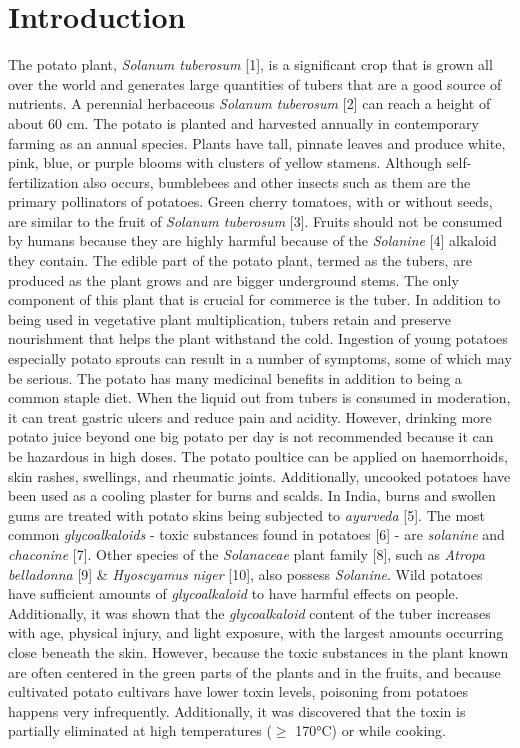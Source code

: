 \documentclass[conference]{IEEEtran}
\begin{document}
\section{Introduction}
The potato plant, \textit{Solanum tuberosum} [1], is a significant crop that is grown all over the world and generates large quantities of tubers that are a good source of nutrients. A perennial herbaceous \textit{Solanum tuberosum} [2] can reach a height of about 60 cm. The potato is planted and harvested annually in contemporary farming as an annual species. Plants have tall, pinnate leaves and produce white, pink, blue, or purple blooms with clusters of yellow stamens. Although self-fertilization also occurs, bumblebees and other insects such as them are the primary pollinators of potatoes. Green cherry tomatoes, with or without seeds, are similar to the fruit of \textit{Solanum tuberosum} [3]. Fruits should not be consumed by humans because they are highly harmful because of the \textit{Solanine} [4] alkaloid they contain. The edible part of the potato plant, termed as the tubers, are produced as the plant grows and are bigger underground stems. The only component of this plant that is crucial for commerce is the tuber. In addition to being used in vegetative plant multiplication, tubers retain and preserve nourishment that helps the plant withstand the cold. Ingestion of young potatoes especially potato sprouts can result in a number of symptoms, some of which may be serious. The potato has many medicinal benefits in addition to being a common staple diet. When the liquid out from tubers is consumed in moderation, it can treat gastric ulcers and reduce pain and acidity. However, drinking more potato juice beyond one big potato per day is not recommended because it can be hazardous in high doses. The potato poultice can be applied on haemorrhoids, skin rashes, swellings, and rheumatic joints. Additionally, uncooked potatoes have been used as a cooling plaster for burns and scalds. In India, burns and swollen gums are treated with potato skins being subjected to \textit{ayurveda} [5]. The most common \textit{glycoalkaloids} - toxic substances found in potatoes [6] - are \textit{solanine} and \textit{chaconine} [7]. Other species of the \textit{Solanaceae} plant family [8], such as \textit{Atropa belladonna} [9] \& \textit{Hyoscyamus niger} [10], also possess \textit{Solanine}. Wild potatoes have sufficient amounts of \textit{glycoalkaloid} to have harmful effects on people. Additionally, it was shown that the \textit{glycoalkaloid} content of the tuber increases with age, physical injury, and light exposure, with the largest amounts occurring close beneath the skin. However, because the toxic substances in the plant known are often centered in the green parts of the plants and in the fruits, and because cultivated potato cultivars have lower toxin levels, poisoning from potatoes happens very infrequently. Additionally, it was discovered that the toxin is partially eliminated at high temperatures ($\ge$ 170°C) or while cooking. \\
\end{document}
